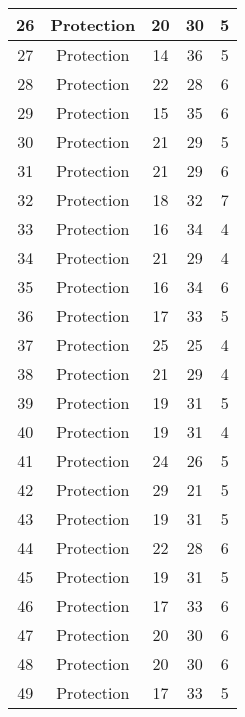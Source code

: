 \documentclass[results.tex]{subfiles}
\begin{document}
\begin{center}
\begin{tabular}{| c || c | c | c | c |}
    \hline
    26 & Protection & 20 & 30 & 5 \\ 
    \hline
    27 & Protection & 14 & 36 & 5 \\ 
    \hline
    28 & Protection & 22 & 28 & 6 \\ 
    \hline
    29 & Protection & 15 & 35 & 6 \\ 
    \hline
    30 & Protection & 21 & 29 & 5 \\ 
    \hline
    31 & Protection & 21 & 29 & 6 \\ 
    \hline
    32 & Protection & 18 & 32 & 7 \\ 
    \hline
    33 & Protection & 16 & 34 & 4 \\ 
    \hline
    34 & Protection & 21 & 29 & 4 \\ 
    \hline
    35 & Protection & 16 & 34 & 6 \\ 
    \hline
    36 & Protection & 17 & 33 & 5 \\ 
    \hline
    37 & Protection & 25 & 25 & 4 \\ 
    \hline
    38 & Protection & 21 & 29 & 4 \\ 
    \hline
    39 & Protection & 19 & 31 & 5 \\ 
    \hline
    40 & Protection & 19 & 31 & 4 \\ 
    \hline
    41 & Protection & 24 & 26 & 5 \\ 
    \hline
    42 & Protection & 29 & 21 & 5 \\ 
    \hline
    43 & Protection & 19 & 31 & 5 \\ 
    \hline
    44 & Protection & 22 & 28 & 6 \\ 
    \hline
    45 & Protection & 19 & 31 & 5 \\ 
    \hline
    46 & Protection & 17 & 33 & 6 \\ 
    \hline
    47 & Protection & 20 & 30 & 6 \\ 
    \hline
    48 & Protection & 20 & 30 & 6 \\ 
    \hline
    49 & Protection & 17 & 33 & 5 \\ 
    \hline   \end{tabular}
\end{center}
\end{document}
